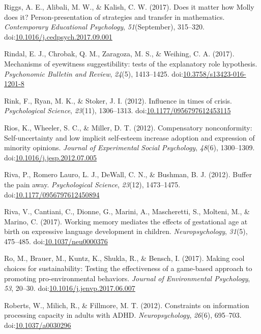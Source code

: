 \documentclass[english,man]{apa6}
\begin{document}
\hypertarget{ref-Riggs2017}{}
Riggs, A. E., Alibali, M. W., \& Kalish, C. W. (2017). Does it matter
how Molly does it? Person-presentation of strategies and transfer in
mathematics. \emph{Contemporary Educational Psychology},
\emph{51}(September), 315--320.
doi:\href{https://doi.org/10.1016/j.cedpsych.2017.09.001}{10.1016/j.cedpsych.2017.09.001}

\hypertarget{ref-Rindal2017}{}
Rindal, E. J., Chrobak, Q. M., Zaragoza, M. S., \& Weihing, C. A.
(2017). Mechanisms of eyewitness suggestibility: tests of the
explanatory role hypothesis. \emph{Psychonomic Bulletin and Review},
\emph{24}(5), 1413--1425.
doi:\href{https://doi.org/10.3758/s13423-016-1201-8}{10.3758/s13423-016-1201-8}

\hypertarget{ref-Rink2012}{}
Rink, F., Ryan, M. K., \& Stoker, J. I. (2012). Influence in times of
crisis. \emph{Psychological Science}, \emph{23}(11), 1306--1313.
doi:\href{https://doi.org/10.1177/0956797612453115}{10.1177/0956797612453115}

\hypertarget{ref-Rios2012}{}
Rios, K., Wheeler, S. C., \& Miller, D. T. (2012). Compensatory
nonconformity: Self-uncertainty and low implicit self-esteem increase
adoption and expression of minority opinions. \emph{Journal of
Experimental Social Psychology}, \emph{48}(6), 1300--1309.
doi:\href{https://doi.org/10.1016/j.jesp.2012.07.005}{10.1016/j.jesp.2012.07.005}

\hypertarget{ref-Riva2012}{}
Riva, P., Romero Lauro, L. J., DeWall, C. N., \& Bushman, B. J. (2012).
Buffer the pain away. \emph{Psychological Science}, \emph{23}(12),
1473--1475.
doi:\href{https://doi.org/10.1177/0956797612450894}{10.1177/0956797612450894}

\hypertarget{ref-Riva2017}{}
Riva, V., Cantiani, C., Dionne, G., Marini, A., Mascheretti, S.,
Molteni, M., \& Marino, C. (2017). Working memory mediates the effects
of gestational age at birth on expressive language development in
children. \emph{Neuropsychology}, \emph{31}(5), 475--485.
doi:\href{https://doi.org/10.1037/neu0000376}{10.1037/neu0000376}

\hypertarget{ref-Ro2017}{}
Ro, M., Brauer, M., Kuntz, K., Shukla, R., \& Bensch, I. (2017). Making
cool choices for sustainability: Testing the effectiveness of a
game-based approach to promoting pro-environmental behaviors.
\emph{Journal of Environmental Psychology}, \emph{53}, 20--30.
doi:\href{https://doi.org/10.1016/j.jenvp.2017.06.007}{10.1016/j.jenvp.2017.06.007}

\hypertarget{ref-Roberts2012}{}
Roberts, W., Milich, R., \& Fillmore, M. T. (2012). Constraints on
information processing capacity in adults with ADHD.
\emph{Neuropsychology}, \emph{26}(6), 695--703.
doi:\href{https://doi.org/10.1037/a0030296}{10.1037/a0030296}
\end{document}
